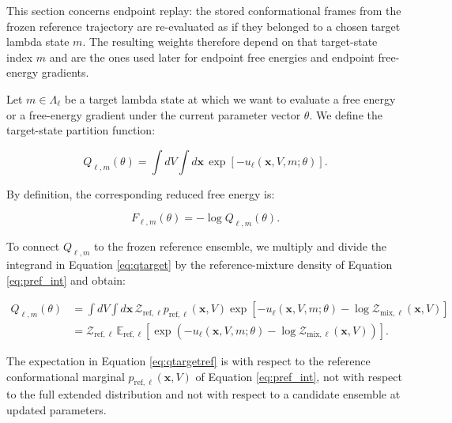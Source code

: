 This section concerns endpoint replay: the stored conformational frames from the frozen reference trajectory are re-evaluated as if they belonged to a chosen target lambda state $m$. The resulting weights therefore depend on that target-state index $m$ and are the ones used later for endpoint free energies and endpoint free-energy gradients.

Let $m \in \Lambda_\ell$ be a target lambda state at which we want to evaluate a free energy or a free-energy gradient under the current parameter vector $\theta$. We define the target-state partition function:

\begin{equation}
    Q_{\ell,m}(\theta)
    =
    \int dV \int d\mathbf{x} \,
    \exp \left[
        -u_\ell(\mathbf{x}, V, m; \theta)
    \right].
    \label{eq:qtarget}
\end{equation}

By definition, the corresponding reduced free energy is:

\begin{equation}
    F_{\ell,m}(\theta)
    =
    -\log Q_{\ell,m}(\theta).
    \label{eq:ftarget}
\end{equation}

To connect $Q_{\ell,m}$ to the frozen reference ensemble, we multiply and divide the integrand in Equation \eqref{eq:qtarget} by the reference-mixture density of Equation \eqref{eq:pref_int} and obtain:

\begin{align}
    Q_{\ell,m}(\theta)
    &=
    \int dV \int d\mathbf{x} \,
    \mathcal{Z}_{\mathrm{ref},\ell}
    p_{\mathrm{ref},\ell}(\mathbf{x}, V)
    \exp \left[
        -u_\ell(\mathbf{x}, V, m; \theta)
        -
        \log \mathcal{Z}_{\mathrm{mix},\ell}(\mathbf{x}, V)
    \right]
    \nonumber \\
    &=
    \mathcal{Z}_{\mathrm{ref},\ell}
    \,
    \mathbb{E}_{\mathrm{ref},\ell}
    \left[
        \exp \left(
            -u_\ell(\mathbf{x}, V, m; \theta)
            -
            \log \mathcal{Z}_{\mathrm{mix},\ell}(\mathbf{x}, V)
        \right)
    \right].
    \label{eq:qtargetref}
\end{align}

The expectation in Equation \eqref{eq:qtargetref} is with respect to the reference conformational marginal $p_{\mathrm{ref},\ell}(\mathbf{x}, V)$ of Equation \eqref{eq:pref_int}, not with respect to the full extended distribution and not with respect to a candidate ensemble at updated parameters.

